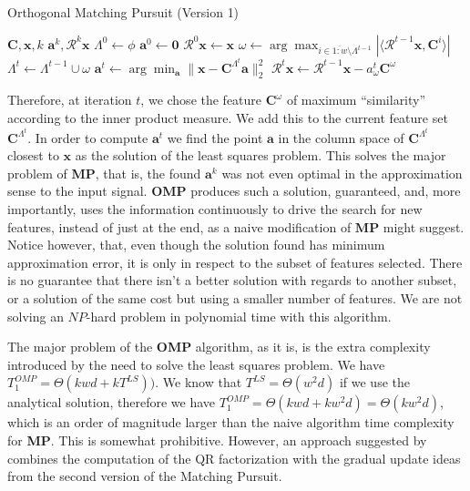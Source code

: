 \documentclass[12pt,a4paper,oneside,english]{UPBThesis}
\newcommand{\hcrange}[2]{\overline{{#1}\colon\!\!{#2}}}
\begin{document}
\begin{algorithm}
\caption{Orthogonal Matching Pursuit (Version 1)}
\label{algo:OrthogonalMatchingPursuitMethodV1}
\begin{algorithmic}
\Require $\textbf{C},\textbf{x},k$
\Ensure $\textbf{a}^k,\mathcal{R}^k\textbf{x}$
\State $\Lambda^0 \gets \phi$
\State $\textbf{a}^0 \gets \textbf{0}$
\State $\mathcal{R}^0\textbf{x} \gets \textbf{x}$
\For {$t = \hcrange{1}{k}$}
\State $\omega \gets \arg \max_{i \in \hcrange{1}{w} \setminus \Lambda^{t-1}} \left| \langle \mathcal{R}^{t-1}\textbf{x} , \textbf{C}^i \rangle \right|$
\State $\Lambda^t \gets \Lambda^{t-1} \cup \omega$
\State $\textbf{a}^t \gets \arg\min_{\textbf{a}} {\| \textbf{x} - \textbf{C}^{\Lambda^t}\textbf{a} \|_2^2}$
\State $\mathcal{R}^t\textbf{x} \gets \mathcal{R}^{t-1}\textbf{x} - a_\omega^t\textbf{C}^\omega$
\EndFor
\end{algorithmic}
\end{algorithm}

Therefore, at iteration $t$, we chose the feature $\textbf{C}^\omega$ of maximum ``similarity'' according to the inner product measure. We add this to the current feature set $\textbf{C}^{\Lambda^t}$. In order to compute $\textbf{a}^t$ we find the point $\textbf{a}$ in the column space of $\textbf{C}^{\Lambda^t}$ closest to $\textbf{x}$ as the solution of the least squares problem. This solves the major problem of \textbf{MP}, that is, the found $\textbf{a}^k$ was not even optimal in the approximation sense to the input signal. \textbf{OMP} produces such a solution, guaranteed, and, more importantly, uses the information continuously to drive the search for new features, instead of just at the end, as a naive modification of $\textbf{MP}$ might suggest. Notice however, that, even though the solution found has minimum approximation error, it is only in respect to the subset of features selected. There is no guarantee that there isn't a better solution with regards to another subset, or a solution of the same cost but using a smaller number of features. We are not solving an $NP$-hard problem in polynomial time with this algorithm.

The major problem of the \textbf{OMP} algorithm, as it is, is the extra complexity introduced by the need to solve the least squares problem. We have $T_1^{OMP} = \Theta(kwd + kT^{LS}))$. We know that $T^{LS} = \Theta(w^2d)$ if we use the analytical solution, therefore we have $T_1^{OMP} = \Theta(kwd + kw^2d) = \Theta(kw^2d)$, which is an order of magnitude larger than the naive algorithm time complexity for \textbf{MP}. This is somewhat prohibitive. However, an approach suggested by \cite{matchingpursuit2,pursuitdifferences} combines the computation of the QR factorization with the gradual update ideas from the second version of the Matching Pursuit.
\end{document}
